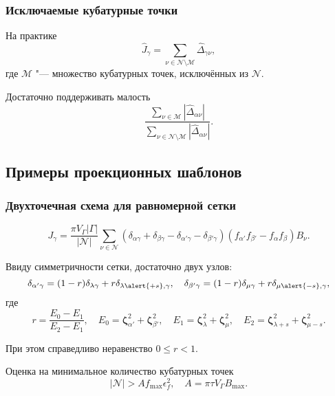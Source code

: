 \documentclass[mathserif]{beamer} %
\newcommand{\bzeta}{\boldsymbol{\zeta}}
\newcommand{\Nu}{\mathcal{N}}
\begin{document}
\begin{frame}
    \frametitle{Исключаемые кубатурные точки}
    На практике
    \begin{equation}\label{eq:discrete_short_ci_discarded}
        \hat{J}_\gamma = \sum_{\nu\in\Nu\setminus\mathcal{M}} \hat{\Delta}_{\gamma\nu},
    \end{equation}
    где \(\mathcal{M}\) "--- множество кубатурных точек, исключённых из \(\Nu\).
    \vspace{20pt}\pause

    Достаточно поддерживать малость
    \begin{equation}\label{eq:excluded_contribution}
        \frac{\sum_{\nu\in\mathcal{M}} \left| \hat{\Delta}_{\alpha\nu} \right|}
            {\sum_{\nu\in\Nu\setminus\mathcal{M}} \left| \hat{\Delta}_{\alpha\nu} \right|}.
    \end{equation}
\end{frame}

\subsection{Примеры проекционных шаблонов}

\begin{frame}
    \frametitle{Двухточечная схема для равномерной сетки}
    \begin{equation}\label{eq:discrete_symm_ci_uniform}
        J_\gamma = \frac{\pi V_\Gamma|\Gamma|}{|\Nu|}
            \sum_{\nu\in\Nu} \left(
                \delta_{\alpha\gamma} + \delta_{\beta\gamma}
                - \delta_{\alpha'\gamma} - \delta_{\beta'\gamma}
            \right)\left( f_{\alpha'} f_{\beta'} - f_{\alpha} f_{\beta} \right)B_\nu.
    \end{equation}
    \vspace{-20pt}\pause

    Ввиду симметричности сетки, достаточно двух узлов:
    \begin{equation}\label{eq:uniform_projection}
        \delta_{\alpha'\gamma} = (1-r)\delta_{\lambda\gamma} + r\delta_{\lambda\alert{+s},\gamma}, \quad
        \delta_{\beta'\gamma} = (1-r)\delta_{\mu\gamma} + r\delta_{\mu\alert{-s},\gamma},
    \end{equation}
    где
    \begin{equation}\label{eq:r_uniform}
        r = \frac{E_0-E_1}{E_2-E_1}, \quad
        E_0 = \bzeta_{\alpha'}^2 + \bzeta_{\beta'}^2, \quad
        E_1 = \bzeta_{\lambda}^2 + \bzeta_{\mu}^2, \quad
        E_2 = \bzeta_{\lambda+s}^2 + \bzeta_{\mu-s}^2.
    \end{equation}
    \vspace{-20pt}\pause

    При этом справедливо неравенство \(0\leq r < 1\).

    Оценка на минимальное количество кубатурных точек
    \begin{equation}\label{eq:positive_f_uniform}
       |\Nu| > A f_{\max} \epsilon_f^2, \quad A = \pi \tau V_\Gamma B_{\max}.
    \end{equation}
\end{frame}
\end{document}
